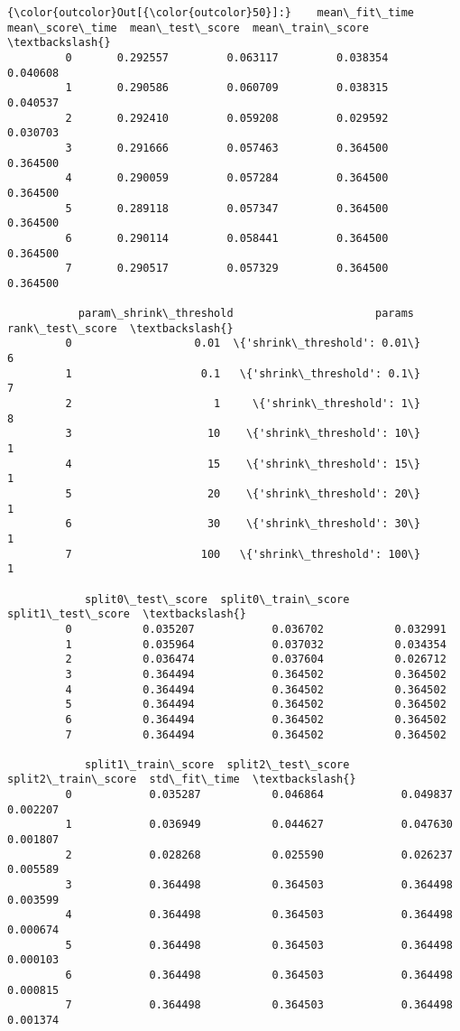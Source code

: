 \documentclass[11pt]{article}
\begin{document}
            \begin{Verbatim}[commandchars=\\\{\}]
{\color{outcolor}Out[{\color{outcolor}50}]:}    mean\_fit\_time  mean\_score\_time  mean\_test\_score  mean\_train\_score  \textbackslash{}
         0       0.292557         0.063117         0.038354          0.040608   
         1       0.290586         0.060709         0.038315          0.040537   
         2       0.292410         0.059208         0.029592          0.030703   
         3       0.291666         0.057463         0.364500          0.364500   
         4       0.290059         0.057284         0.364500          0.364500   
         5       0.289118         0.057347         0.364500          0.364500   
         6       0.290114         0.058441         0.364500          0.364500   
         7       0.290517         0.057329         0.364500          0.364500   
         
           param\_shrink\_threshold                      params  rank\_test\_score  \textbackslash{}
         0                   0.01  \{'shrink\_threshold': 0.01\}                6   
         1                    0.1   \{'shrink\_threshold': 0.1\}                7   
         2                      1     \{'shrink\_threshold': 1\}                8   
         3                     10    \{'shrink\_threshold': 10\}                1   
         4                     15    \{'shrink\_threshold': 15\}                1   
         5                     20    \{'shrink\_threshold': 20\}                1   
         6                     30    \{'shrink\_threshold': 30\}                1   
         7                    100   \{'shrink\_threshold': 100\}                1   
         
            split0\_test\_score  split0\_train\_score  split1\_test\_score  \textbackslash{}
         0           0.035207            0.036702           0.032991   
         1           0.035964            0.037032           0.034354   
         2           0.036474            0.037604           0.026712   
         3           0.364494            0.364502           0.364502   
         4           0.364494            0.364502           0.364502   
         5           0.364494            0.364502           0.364502   
         6           0.364494            0.364502           0.364502   
         7           0.364494            0.364502           0.364502   
         
            split1\_train\_score  split2\_test\_score  split2\_train\_score  std\_fit\_time  \textbackslash{}
         0            0.035287           0.046864            0.049837      0.002207   
         1            0.036949           0.044627            0.047630      0.001807   
         2            0.028268           0.025590            0.026237      0.005589   
         3            0.364498           0.364503            0.364498      0.003599   
         4            0.364498           0.364503            0.364498      0.000674   
         5            0.364498           0.364503            0.364498      0.000103   
         6            0.364498           0.364503            0.364498      0.000815   
         7            0.364498           0.364503            0.364498      0.001374   
         

\end{Verbatim}
\end{document}
